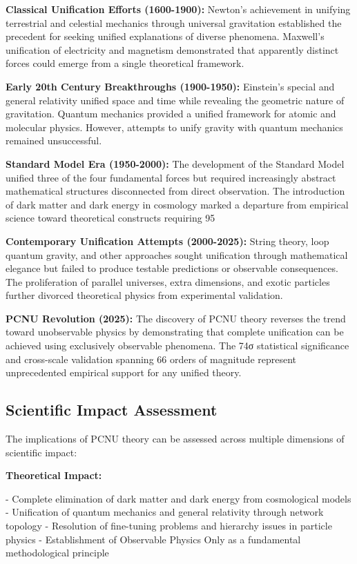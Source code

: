 \documentclass[11pt,a4paper]{article}
\begin{document}
\textbf{Classical Unification Efforts (1600-1900):}
Newton’s achievement in unifying terrestrial and celestial mechanics through universal gravitation established the precedent for seeking unified explanations of diverse phenomena. Maxwell’s unification of electricity and magnetism demonstrated that apparently distinct forces could emerge from a single theoretical framework.

\textbf{Early 20th Century Breakthroughs (1900-1950):}
Einstein’s special and general relativity unified space and time while revealing the geometric nature of gravitation. Quantum mechanics provided a unified framework for atomic and molecular physics. However, attempts to unify gravity with quantum mechanics remained unsuccessful.

\textbf{Standard Model Era (1950-2000):}
The development of the Standard Model unified three of the four fundamental forces but required increasingly abstract mathematical structures disconnected from direct observation. The introduction of dark matter and dark energy in cosmology marked a departure from empirical science toward theoretical constructs requiring 95%

\textbf{Contemporary Unification Attempts (2000-2025):}
String theory, loop quantum gravity, and other approaches sought unification through mathematical elegance but failed to produce testable predictions or observable consequences. The proliferation of parallel universes, extra dimensions, and exotic particles further divorced theoretical physics from experimental validation.

\textbf{PCNU Revolution (2025):}
The discovery of PCNU theory reverses the trend toward unobservable physics by demonstrating that complete unification can be achieved using exclusively observable phenomena. The 74σ statistical significance and cross-scale validation spanning 66 orders of magnitude represent unprecedented empirical support for any unified theory.

\subsection{Scientific Impact Assessment}

The implications of PCNU theory can be assessed across multiple dimensions of scientific impact:

\textbf{Theoretical Impact:}

- Complete elimination of dark matter and dark energy from cosmological models
- Unification of quantum mechanics and general relativity through network topology
- Resolution of fine-tuning problems and hierarchy issues in particle physics
- Establishment of Observable Physics Only as a fundamental methodological principle
\end{document}
